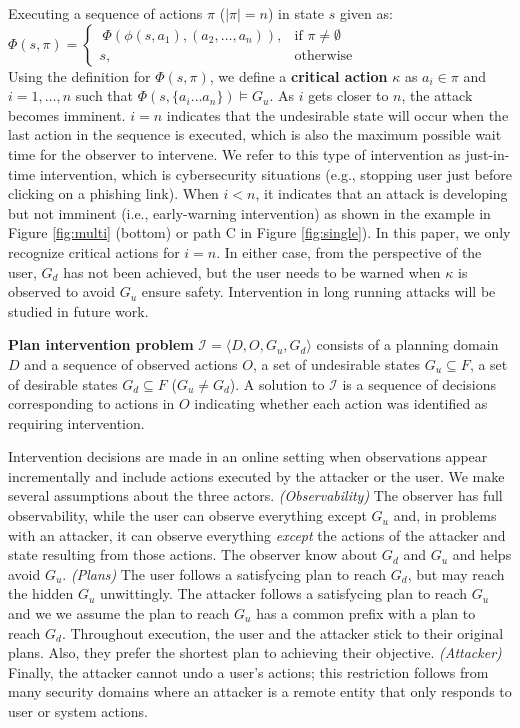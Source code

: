 Executing a sequence of actions $\pi$ ($ \left|\pi\right|=n$) in state $s$ given as:\\
$\Phi (s,\pi)=\begin{cases}
                 \ \Phi(\phi(s,a_1),(a_2,\ldots,a_n)),& \text{if } \pi \neq \emptyset\\
                          s,& \text{otherwise}
                        \end{cases}$
\\Using the definition for $\Phi (s,\pi)$, we define a \textbf{critical action} $\kappa $ as $a_i \in \pi$ and $i=1,\ldots,n$ such that $\Phi(s,\lbrace a_i\ldots a_n\rbrace) \models G_u$. As $i$ gets closer to $n$, the attack becomes imminent. $i=n$ indicates that the undesirable state will occur when the last action in the sequence is executed, which is also the maximum possible wait time for the observer to intervene. We refer to this type of intervention as just-in-time intervention, which is cybersecurity situations (e.g., stopping user just before clicking on a phishing link). When $i<n$, it indicates that an attack is developing but not imminent (i.e., early-warning intervention) as shown in the example in Figure \ref{fig:multi} (bottom) or path C in Figure \ref{fig:single}). In this paper, we only recognize critical actions for $i=n$. In either case, from the perspective of the user, $G_d$ has not been achieved, but the user needs to be warned when $\kappa$ is observed to avoid $G_u$ ensure safety. Intervention in long running attacks will be studied in future work.

\textbf{Plan intervention problem} $\mathcal{I} = \langle D, O, G_u, G_d \rangle$ consists of a planning domain $D$ and a sequence of observed actions  $O$, a set of undesirable states $G_u \subseteq F$, a set of desirable states $G_d \subseteq F$ ($G_u \neq G_d$). A solution to $\mathcal{I}$ is a sequence of decisions corresponding to actions in $O$ indicating whether each action was identified as requiring intervention. 

Intervention decisions are made in an online setting when observations appear incrementally and include actions executed by the attacker or the user.  We make several assumptions about the three actors. \emph{(Observability)} The observer has full observability, while the user can observe everything except $G_u$ and, in problems with an attacker,  it can  observe everything \emph{except} the actions of the attacker and state resulting from those actions.
The observer know about $G_d$ and $G_u$ and helps avoid $G_u$.
\emph{(Plans)}
The user follows a satisfycing plan to reach $G_d$, but may reach the hidden $G_u$ unwittingly.
The attacker follows a satisfycing plan to reach $G_u$ and we we assume the plan to reach $G_u$ has a common prefix with a plan to reach $G_d$. 
Throughout execution, the user and the attacker stick to their original plans.
Also, they prefer the shortest plan to achieving their objective.
\emph{(Attacker)}
Finally, the attacker cannot undo a user's actions; this restriction follows from many security domains where an attacker is a remote entity that only responds to user or system actions.


